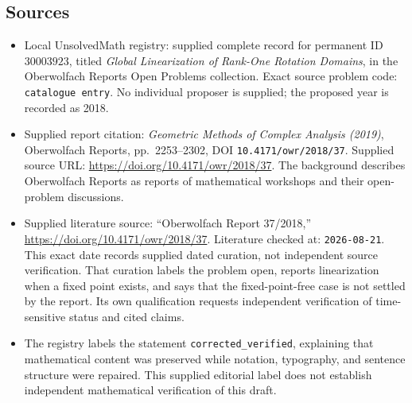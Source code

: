 \documentclass[11pt]{article}
\begin{document}
\subsection{Sources}
\begin{itemize}
\item Local UnsolvedMath registry: supplied complete record for permanent ID \(30003923\), titled \emph{Global Linearization of Rank-One Rotation Domains}, in the Oberwolfach Reports Open Problems collection. Exact source problem code: \texttt{catalogue entry}. No individual proposer is supplied; the proposed year is recorded as 2018.
\item Supplied report citation: \emph{Geometric Methods of Complex Analysis (2019)}, Oberwolfach Reports, pp.\ 2253--2302, DOI \texttt{10.4171/owr/2018/37}. Supplied source URL: \url{https://doi.org/10.4171/owr/2018/37}. The background describes Oberwolfach Reports as reports of mathematical workshops and their open-problem discussions.
\item Supplied literature source: ``Oberwolfach Report 37/2018,'' \url{https://doi.org/10.4171/owr/2018/37}. Literature checked at: \texttt{2026-08-21}. This exact date records supplied dated curation, not independent source verification. That curation labels the problem open, reports linearization when a fixed point exists, and says that the fixed-point-free case is not settled by the report. Its own qualification requests independent verification of time-sensitive status and cited claims.
\item The registry labels the statement \texttt{corrected\_verified}, explaining that mathematical content was preserved while notation, typography, and sentence structure were repaired. This supplied editorial label does not establish independent mathematical verification of this draft.
\end{itemize}
\end{document}
